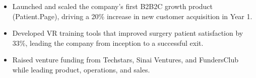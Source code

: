 \documentclass[10pt,a4paper,withhyper]{altacv}
\begin{document}
\begin{itemize}
\item Launched and scaled the company's first B2B2C growth product (Patient.Page), driving a 20\% increase in new customer acquisition in Year 1.
\end{itemize}

\begin{itemize}
\item Developed VR training tools that improved surgery patient satisfaction by 33\%, leading the company from inception to a successful exit.
\item Raised venture funding from Techstars, Sinai Ventures, and FundersClub while leading product, operations, and sales.
\end{itemize}


\end{document}
